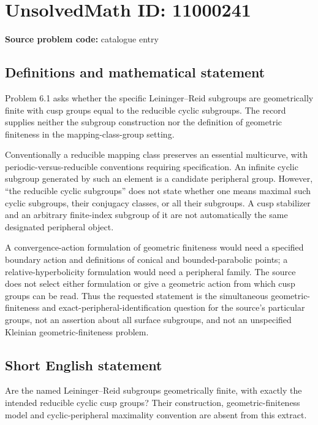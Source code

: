 \documentclass[11pt]{article}
\begin{document}
\section*{UnsolvedMath ID: 11000241}
\textbf{Source problem code:} catalogue entry
\subsection{Definitions and mathematical statement}
Problem 6.1 asks whether the specific Leininger--Reid subgroups are geometrically finite with cusp groups equal to the reducible cyclic subgroups. The record supplies neither the subgroup construction nor the definition of geometric finiteness in the mapping-class-group setting.

Conventionally a reducible mapping class preserves an essential multicurve, with periodic-versus-reducible conventions requiring specification. An infinite cyclic subgroup generated by such an element is a candidate peripheral group. However, ``the reducible cyclic subgroups'' does not state whether one means maximal such cyclic subgroups, their conjugacy classes, or all their subgroups. A cusp stabilizer and an arbitrary finite-index subgroup of it are not automatically the same designated peripheral object.

A convergence-action formulation of geometric finiteness would need a specified boundary action and definitions of conical and bounded-parabolic points; a relative-hyperbolicity formulation would need a peripheral family. The source does not select either formulation or give a geometric action from which cusp groups can be read. Thus the requested statement is the simultaneous geometric-finiteness and exact-peripheral-identification question for the source's particular groups, not an assertion about all surface subgroups, and not an unspecified Kleinian geometric-finiteness problem.
\subsection{Short English statement}
Are the named Leininger--Reid subgroups geometrically finite, with exactly the intended reducible cyclic cusp groups? Their construction, geometric-finiteness model and cyclic-peripheral maximality convention are absent from this extract.
\end{document}
